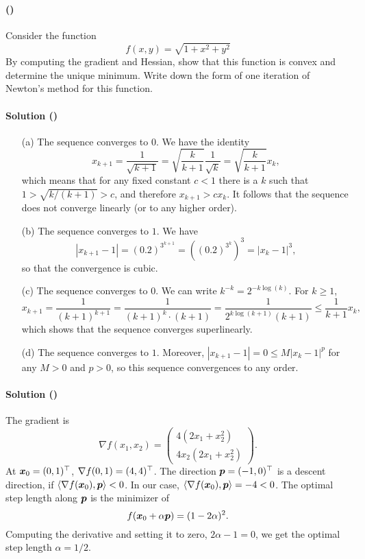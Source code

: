 \documentclass{article}
\newcounter{problems}
\renewcommand{\problem}[1]{\paragraph{(\theproblems)}\addtocounter{problems}{1}\label{#1}}
\newcommand{\marks}[2][0mm]{\hspace{30mm}\mbox{}\vskip #1\hspace{-30mm}\hfill{\sf [#2 marks]}\\[-\baselineskip]}
\renewcommand{\marks}[2][0mm]{\hspace{30mm}\mbox{}\vskip #1\hspace{-30mm}\hfill{\sf [#2 marks]}\\[-\baselineskip]}
\renewcommand{\solution}[1]{\paragraph{Solution (\theproblems)}\addtocounter{problems}{1}\label{#1}}
\begin{document}
\marks[-6mm]{4} 

\problem{p4} Consider the function
\begin{equation*}
 f(x,y) = \sqrt{1+x^2+y^2}
\end{equation*}
By computing the gradient and Hessian, show that this function is convex and determine the unique minimum. Write down the form of one iteration of Newton's method for this function.
\marks[-4mm]{4}

\newpage

\setcounter{problems}{0}

\solution{so1} 
\begin{itemize}
                \item[(a)] The sequence converges to $0$. We have the identity
\begin{equation*}
 x_{k+1} = \frac{1}{\sqrt{k+1}} = \sqrt{\frac{k}{k+1}} \frac{1}{\sqrt{k}}=\sqrt{\frac{k}{k+1}} x_k,
\end{equation*}
which means that for any fixed constant $c<1$ there is a $k$ such that $1>\sqrt{k/(k+1)}>c$, and therefore $x_{k+1} > cx_k$. It follows that the sequence does not converge linearly (or to any higher order).
\item[(b)] The sequence converges to $1$. We have
\begin{equation*}
 |x_{k+1}-1| = (0.2)^{3^{k+1}} = \left((0.2)^{3^{k}}\right)^3 = |x_k-1|^3,
\end{equation*}
so that the convergence is cubic.
\item[(c)] The sequence converges to $0$. 
We can write $k^{-k}=2^{-k\log(k)}$. For $k\geq 1$,
\begin{equation*}
 x_{k+1} = \frac{1}{(k+1)^{k+1}} = \frac{1}{(k+1)^k \cdot (k+1)} =\frac{1}{2^{k\log(k+1)}(k+1)} \leq \frac{1}{k+1} x_k,
\end{equation*}
which shows that the sequence converges superlinearly.
\item[(d)] The sequence converges to $1$. Moreover, $|x_{k+1}-1|=0\leq M|x_k-1|^p$ for any $M>0$ and $p>0$, so this sequence convergences to any order. 
\end{itemize}

\solution{so2} The gradient is
\begin{equation*}
 \nabla f(x_1,x_2) = \begin{pmatrix}
                      4(2x_1+x_2^2)\\
                      4x_2(2x_1+x_2^2)
                     \end{pmatrix}.
\end{equation*}
At $\bm{x}_0=(0,1)^{\top}$, $\nabla f(0,1) = (4,4)^{\top}$. The direction $\bm{p}=(-1,0)^{\top}$ is a descent direction, if $\langle {\nabla f(\bm{x}_0)}, {\bm{p}} \rangle<0$. In our case,
$\langle {\nabla f(\bm{x}_0)}, {\bm{p}} \rangle = -4<0$.
The optimal step length along $\bm{p}$ is the minimizer of
\begin{equation*}
 f(\bm{x}_0+\alpha\bm{p}) = (1-2\alpha)^2.
\end{equation*}
Computing the derivative and setting it to zero, $2\alpha-1=0$, we get the optimal step length $\alpha=1/2$.
\end{document}
